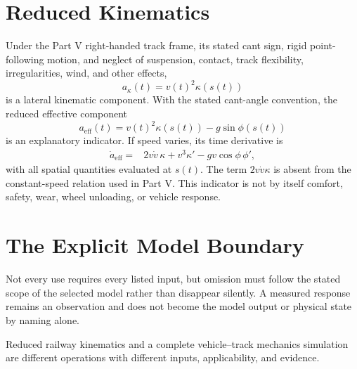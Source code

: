 \section{Reduced Kinematics}

Under the Part V right-handed track frame, its stated cant sign, rigid
point-following motion, and neglect of suspension, contact, track flexibility,
irregularities, wind, and other effects,
\[
a_\kappa(t)=v(t)^2\kappa(s(t))
\]
is a lateral kinematic component. With the stated cant-angle convention, the
reduced effective component
\[
a_{\mathrm{eff}}(t)
=v(t)^2\kappa(s(t))-g\sin\phi(s(t))
\]
is an explanatory indicator. If speed varies, its time derivative is
\begin{align}
\dot a_{\mathrm{eff}}
={}&2v\dot v\,\kappa
  +v^3\kappa'
  -gv\cos\phi\,\phi',
\label{eq:variable-speed-effective-rate}
\end{align}
with all spatial quantities evaluated at \(s(t)\). The term
\(2v\dot v\kappa\) is absent from the constant-speed relation used in Part V.
This indicator is not by itself comfort, safety, wear, wheel unloading, or
vehicle response.

\section{The Explicit Model Boundary}

\begin{center}
\end{center}

Not every use requires every listed input, but omission must follow the stated
scope of the selected model rather than disappear silently. A measured
response remains an observation and does not become the model output or
physical state by naming alone.

\begin{principle}
\label{princ:mechanics-separation}
Reduced railway kinematics and a complete vehicle--track mechanics simulation
are different operations with different inputs, applicability, and evidence.
\end{principle}


